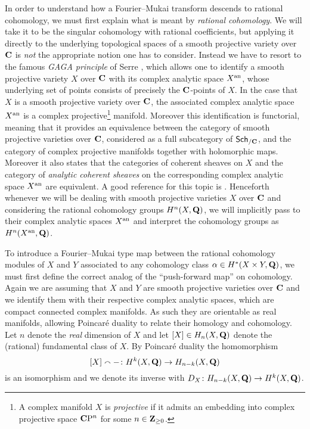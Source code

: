 In order to understand how a Fourier--Mukai transform descends to rational cohomology, we must first explain what is meant by \emph{rational cohomology}. We will take it to be the singular cohomology with rational coefficients, but applying it directly to the underlying topological spaces of a smooth projective variety over $\mathbf C$ is \emph{not} the appropriate notion one has to consider. Instead we have to resort to the famous \emph{GAGA principle} of Serre \cite{Serre1956}, which allows one to identify a smooth projective variety $X$ over $\mathbf C$ with its complex analytic space $X^{\operatorname{an}}$, whose underlying set of points consists of precisely the $\mathbf C$-points of $X$. In the case that $X$ is a smooth projective variety over $\mathbf C$, the associated complex analytic space $X^{\operatorname{an}}$ is a complex projective\footnote{
    A complex manifold $X$ is \emph{projective} if it admits an embedding into complex projective space $\mathbf C\mathrm{P}^n$ for some $n \in \mathbf Z_{\geq 0}$.
} manifold. Moreover this identification is functorial, meaning that it provides an equivalence between the category of smooth projective varieties over $\mathbf C$, considered as a full subcategory of $\mathsf{Sch}_{/\mathbf C}$, and the category of complex projective manifolds together with holomorphic maps. Moreover it also states that the categories of coherent sheaves on $X$ and the category of \emph{analytic coherent sheaves} on the corresponding complex analytic space $X^{\operatorname{an}}$ are equivalent. A good reference for this topic is \cite{GriffithsAdams1984}. Henceforth whenever we will be dealing with smooth projective varieties $X$ over $\mathbf C$ and considering the rational cohomology groups $H^{n}(X, \mathbf Q)$, we will implicitly pass to their complex analytic spaces $X^{\operatorname{an}}$ and interpret the cohomology groups as $H^{n}(X^{\operatorname{an}}, \mathbf Q)$.


To introduce a Fourier--Mukai type map between the rational cohomology modules of $X$ and $Y$ associated to any cohomology class $\alpha \in H^{*}(X \times Y, \mathbf Q)$, we must first define the correct analog of the ``push-forward map'' on cohomology. Again we are assuming that $X$ and $Y$ are smooth projective varieties over $\mathbf C$ and we identify them with their respective complex analytic spaces, which are compact connected complex manifolds.
As such they are orientable as real manifolds, allowing Poincaré duality to relate their homology and cohomology. Let $n$ denote the \emph{real} dimension of $X$ and let $[X] \in H_n(X, \mathbf Q)$ denote the (rational) fundamental class of $X$. By Poincaré duality \cite[\S VI, Theorem 8.3]{Bredon1993} the homomorphism
\[
    [X] \smallfrown - \colon H^{k}(X, \mathbf Q) \to H_{n-k}(X, \mathbf Q)
\]
is an isomorphism and we denote its inverse with $D_X \colon H_{n-k}(X, \mathbf Q) \to H^{k}(X, \mathbf Q)$.

